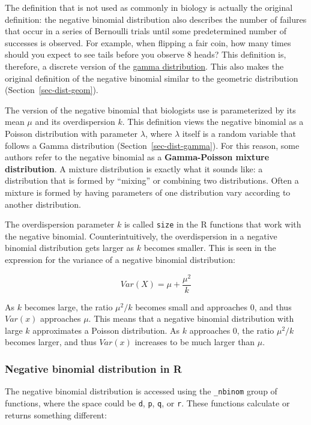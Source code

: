 \documentclass[
  13,
  letterpaper,
]{report}
\begin{document}
The definition that is not used as commonly in biology is actually the
original definition: the negative binomial distribution also describes
the number of failures that occur in a series of Bernoulli trials until
some predetermined number of successes is observed. For example, when
flipping a fair coin, how many times should you expect to see tails
before you observe 8 heads? This definition is, therefore, a discrete
version of the \href{@sec-dist-gamma}{gamma distribution}. This also
makes the original definition of the negative binomial similar to the
geometric distribution (Section~\ref{sec-dist-geom}).

The version of the negative binomial that biologists use is
parameterized by its mean \(\mu\) and its overdispersion \(k\). This
definition views the negative binomial as a Poisson distribution with
parameter \(\lambda\), where \(\lambda\) itself is a random variable
that follows a Gamma distribution (Section~\ref{sec-dist-gamma}). For
this reason, some authors refer to the negative binomial as a
\textbf{Gamma-Poisson mixture distribution}. A mixture distribution is
exactly what it sounds like: a distribution that is formed by ``mixing''
or combining two distributions. Often a mixture is formed by having
parameters of one distribution vary according to another distribution.

The overdispersion parameter \(k\) is called \texttt{size} in the R
functions that work with the negative binomial. Counterintuitively, the
overdispersion in a negative binomial distribution gets larger as \(k\)
becomes smaller. This is seen in the expression for the variance of a
negative binomial distribution:

\[Var\left(X\right)=\mu+\frac{\mu^2}{k}\]

As \(k\) becomes large, the ratio \(\mu^2/k\) becomes small and
approaches 0, and thus \(Var(x)\) approaches \(\mu\). This means that a
negative binomial distribution with large \(k\) approximates a Poisson
distribution. As \(k\) approaches 0, the ratio \(\mu^2/k\) becomes
larger, and thus \(Var(x)\) increases to be much larger than \(\mu\).

\subsubsection{Negative binomial distribution in
R}\label{sec-dist-negbin-r}

The negative binomial distribution is accessed using the
\texttt{\_nbinom} group of functions, where the space could be
\texttt{d}, \texttt{p}, \texttt{q}, or \texttt{r}. These functions
calculate or returns something different:
\end{document}
